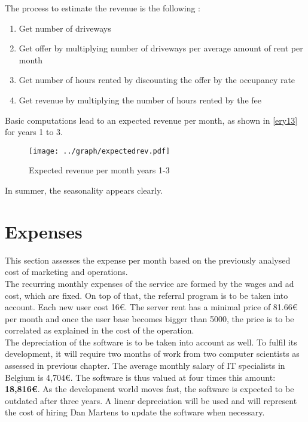 \documentclass[12pt,a4paper,oneside]{book}
\begin{document}
The process to estimate the revenue is the following :
\begin{enumerate}
\item Get number of driveways
\item Get offer by multiplying number of driveways per average amount of rent per month
\item Get number of hours rented by discounting the offer by the occupancy rate
\item Get revenue by multiplying the number of hours rented by the fee
\end{enumerate}

Basic computations lead to an expected revenue per month, as shown in \autoref{ery13} for years 1 to 3.\\

\begin{figure}[h]
\centering
\caption{Expected revenue per month years 1-3}
\label{ery13}
\texttt{[image: ../graph/expectedrev.pdf]}
\end{figure}

In summer, the seasonality appears clearly.

\section{Expenses}
\label{expenses}
This section assesses the expense per month based on the previously analysed cost of marketing and operations.\\

The recurring monthly expenses of the service are formed by the wages and ad cost, which are fixed. On top of that, the referral program is to be taken into account. Each new user cost 16\euro{}. The server rent has a minimal price of 81.66\euro{} per month and once the user base becomes bigger than 5000, the price is to be correlated as explained in the cost of the operation.\\


The depreciation of the software is to be taken into account as well. To fulfil its development, it will require two months of work from two computer scientists as assessed in previous chapter. The average monthly salary of IT specialists in Belgium is 4,704\euro{}. The software is thus valued at four times this amount: \textbf{18,816\euro{}}. As the development world moves fast, the software is expected to be outdated after three years. A linear depreciation will be used and will represent the cost of hiring Dan Martens to update the software when necessary.\\
\end{document}
